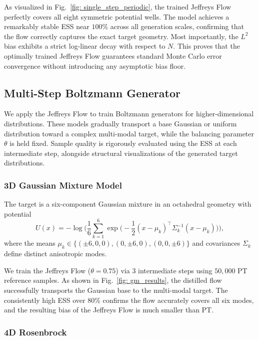 \documentclass[%
 reprint,
 amsmath,amssymb,
 aps,
 pre,
]{revtex4-2}
\newcommand{\T}{\top}
\begin{document}
As visualized in Fig.~\ref{fig: single_step_periodic}, the trained Jeffreys Flow perfectly covers all eight symmetric potential wells. The model achieves a remarkably stable ESS near $100\%$ across all generation scales, confirming that the flow correctly captures the exact target geometry. Most importantly, the $L^2$ bias exhibits a strict log-linear decay with respect to $N$. This proves that the optimally trained Jeffreys Flow guarantees standard Monte Carlo error convergence without introducing any asymptotic bias floor.



\subsection{Multi-Step Boltzmann Generator}

We apply the Jeffreys Flow to train Boltzmann generators for higher-dimensional distributions. These models gradually transport a base Gaussian or uniform distribution toward a complex multi-modal target, while the balancing parameter $\theta$ is held fixed. Sample quality is rigorously evaluated using the ESS at each intermediate step, alongside structural visualizations of the generated target distributions.

\subsubsection*{3D Gaussian Mixture Model}

The target is a six-component Gaussian mixture in an octahedral geometry with potential
\begin{equation*}
	U(x)=-\log \bigg( \frac{1}{6} \sum_{k=1}^6 \exp \bigg( -\frac{1}{2} (x - \mu_k)^\T \Sigma_k^{-1} (x - \mu_k) \bigg) \bigg),
\end{equation*}
where the means $\mu_k \in \{(\pm 6, 0, 0), (0, \pm 6, 0), (0, 0, \pm 6)\}$ and covariances $\Sigma_k$ define distinct anisotropic modes.

We train the Jeffreys Flow ($\theta = 0.75$) via 3 intermediate steps using $50,000$ PT reference samples. As shown in Fig.~\ref{fig: gm_results}, the distilled flow successfully transports the Gaussian base to the multi-modal target. The consistently high ESS over $80\%$ confirms the flow accurately covers all six modes, and the resulting bias of the Jeffreys Flow is much smaller than PT.

\subsubsection*{4D Rosenbrock}
\end{document}
